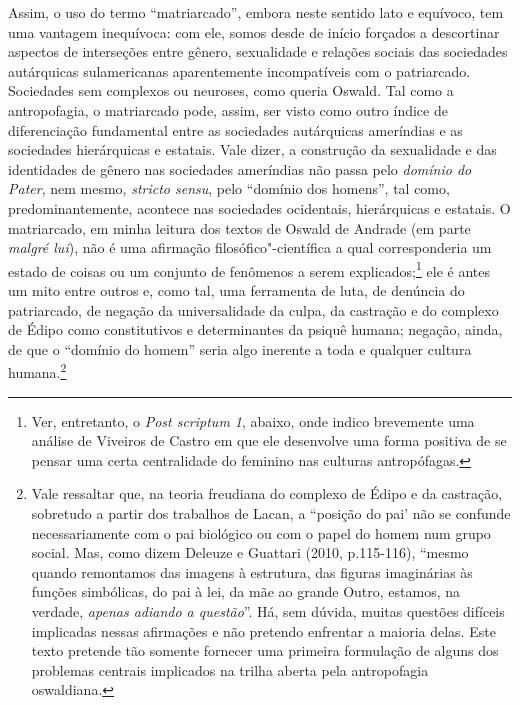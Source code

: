 Assim, o uso do termo ``matriarcado'', embora neste sentido lato e
equívoco, tem uma vantagem inequívoca: com ele, somos desde de início
forçados a descortinar aspectos de interseções entre gênero, sexualidade
e relações sociais das sociedades autárquicas sulamericanas
aparentemente incompatíveis com o patriarcado. Sociedades sem complexos
ou neuroses, como queria Oswald. Tal como a antropofagia, o matriarcado
pode, assim, ser visto como outro índice de diferenciação fundamental
entre as sociedades autárquicas ameríndias e as sociedades hierárquicas
e estatais. Vale dizer, a construção da sexualidade e das identidades de
gênero nas sociedades ameríndias não passa pelo \emph{domínio do Pater},
nem mesmo, \emph{stricto sensu}, pelo ``domínio dos homens'', tal como,
predominantemente, acontece nas sociedades ocidentais, hierárquicas e
estatais. O matriarcado, em minha leitura dos textos de Oswald de
Andrade (em parte \emph{malgré lui}), não é uma afirmação
filosófico"-científica a qual corresponderia um estado de coisas ou um
conjunto de fenômenos a serem explicados;\footnote{Ver, entretanto, o
  \emph{Post scriptum 1}, abaixo, onde indico brevemente uma análise de
  Viveiros de Castro em que ele desenvolve uma forma positiva de se
  pensar uma certa centralidade do feminino nas culturas antropófagas.}
ele é antes um mito entre outros e, como tal, uma ferramenta de
luta, de denúncia do patriarcado, de negação da universalidade da
culpa, da castração e do complexo de Édipo como constitutivos e
determinantes da psiquê humana; negação, ainda, de que o ``domínio do
homem'' seria algo inerente a toda e qualquer cultura humana.\footnote{Vale
  ressaltar que, na teoria freudiana do complexo de Édipo e da
  castração, sobretudo a partir dos trabalhos de Lacan, a ``posição do
  pai' não se confunde necessariamente com o pai biológico ou com o
  papel do homem num grupo social. Mas, como dizem Deleuze e Guattari
  (2010, p.115-116), ``mesmo quando remontamos das imagens à estrutura,
  das figuras imaginárias às funções simbólicas, do pai à lei, da mãe ao
  grande Outro, estamos, na verdade, \emph{apenas adiando a questão}''.
  Há, sem dúvida, muitas questões difíceis implicadas nessas afirmações
  e não pretendo enfrentar a maioria delas. Este texto pretende tão
  somente fornecer uma primeira formulação de alguns dos problemas
  centrais implicados na trilha aberta pela antropofagia oswaldiana.}

